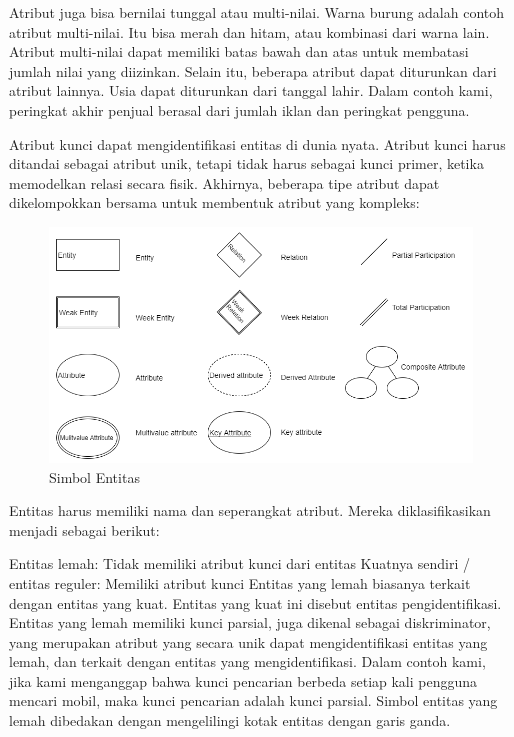 \documentclass[]{book}
\begin{document}
Atribut juga bisa bernilai tunggal atau multi-nilai. Warna burung adalah contoh atribut multi-nilai. Itu bisa merah dan hitam, atau kombinasi dari warna lain. Atribut multi-nilai dapat memiliki batas bawah dan atas untuk membatasi jumlah nilai yang diizinkan. Selain itu, beberapa atribut dapat diturunkan dari atribut lainnya. Usia dapat diturunkan dari tanggal lahir. Dalam contoh kami, peringkat akhir penjual berasal dari jumlah iklan dan peringkat pengguna.

Atribut kunci dapat mengidentifikasi entitas di dunia nyata. Atribut kunci harus ditandai sebagai atribut unik, tetapi tidak harus sebagai kunci primer, ketika memodelkan relasi secara fisik. Akhirnya, beberapa tipe atribut dapat dikelompokkan bersama untuk membentuk atribut yang kompleks:

\begin{figure}

{\centering \includegraphics[width=0.7\linewidth]{img/01/db_model1} 

}

\caption{Simbol Entitas }\label{fig:fig11}
\end{figure}

Entitas harus memiliki nama dan seperangkat atribut. Mereka diklasifikasikan menjadi sebagai berikut:

Entitas lemah: Tidak memiliki atribut kunci dari entitas Kuatnya sendiri / entitas reguler: Memiliki atribut kunci Entitas yang lemah biasanya terkait dengan entitas yang kuat. Entitas yang kuat ini disebut entitas pengidentifikasi. Entitas yang lemah memiliki kunci parsial, juga dikenal sebagai diskriminator, yang merupakan atribut yang secara unik dapat mengidentifikasi entitas yang lemah, dan terkait dengan entitas yang mengidentifikasi. Dalam contoh kami, jika kami menganggap bahwa kunci pencarian berbeda setiap kali pengguna mencari mobil, maka kunci pencarian adalah kunci parsial. Simbol entitas yang lemah dibedakan dengan mengelilingi kotak entitas dengan garis ganda.
\end{document}
